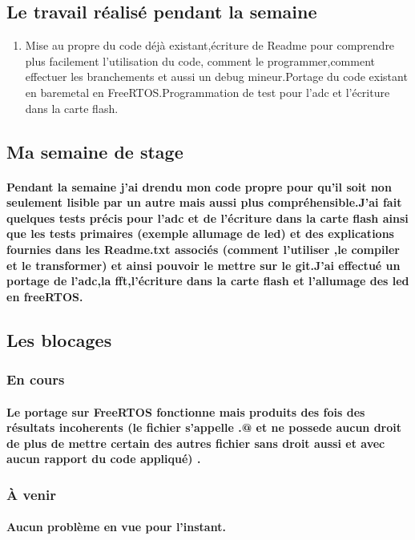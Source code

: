 \documentclass[a4paper]{article}
\begin{document}
 \subsection{Le travail réalisé pendant la semaine}
 \begin{enumerate}
\item {Mise au propre du code déjà existant,écriture de Readme pour comprendre plus facilement l'utilisation du code, comment le programmer,comment effectuer les branchements et aussi un debug mineur.Portage du code existant en baremetal en FreeRTOS.Programmation de test pour l'adc et l'écriture dans la carte flash.}
\end{enumerate}

\subsection{Ma semaine de stage}
    \paragraph{Pendant la semaine j'ai drendu mon code propre pour qu'il soit non seulement lisible par un autre mais aussi plus compréhensible.J'ai fait quelques tests précis pour l'adc et de l'écriture dans la carte flash ainsi que les tests primaires (exemple allumage de led) et des explications fournies dans les Readme.txt associés (comment l'utiliser ,le compiler et le transformer) et ainsi pouvoir le mettre sur le git.J'ai effectué un portage de l'adc,la fft,l'écriture dans la carte flash et l'allumage des led en freeRTOS.}
    
    \subsection{Les blocages}
\subsubsection{En cours}
    \paragraph{Le portage sur FreeRTOS fonctionne mais produits des fois des résultats incoherents (le fichier s'appelle .@ et ne possede aucun droit de plus de mettre certain des autres fichier sans droit aussi et avec aucun rapport du code appliqué) .}
\subsubsection{À venir}
    \paragraph{Aucun problème en vue pour l'instant.}
	\paragraph{}
\end{document}

